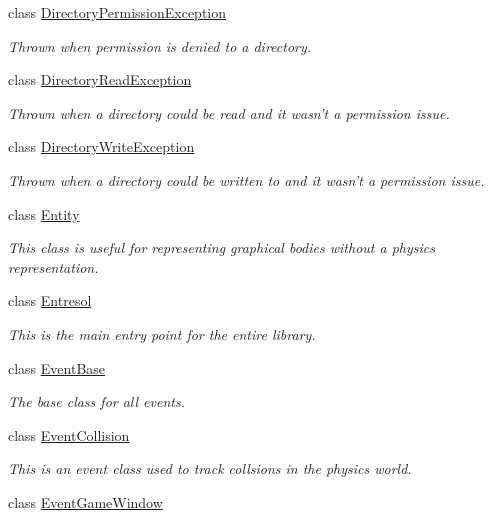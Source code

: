 \begin{DoxyCompactItemize}
class \hyperlink{classMezzanine_1_1DirectoryPermissionException}{Directory\-Permission\-Exception}
\begin{DoxyCompactList}\small\item\em Thrown when permission is denied to a directory. \end{DoxyCompactList}\item 
class \hyperlink{classMezzanine_1_1DirectoryReadException}{Directory\-Read\-Exception}
\begin{DoxyCompactList}\small\item\em Thrown when a directory could be read and it wasn't a permission issue. \end{DoxyCompactList}\item 
class \hyperlink{classMezzanine_1_1DirectoryWriteException}{Directory\-Write\-Exception}
\begin{DoxyCompactList}\small\item\em Thrown when a directory could be written to and it wasn't a permission issue. \end{DoxyCompactList}\item 
class \hyperlink{classMezzanine_1_1Entity}{Entity}
\begin{DoxyCompactList}\small\item\em This class is useful for representing graphical bodies without a physics representation. \end{DoxyCompactList}\item 
class \hyperlink{classMezzanine_1_1Entresol}{Entresol}
\begin{DoxyCompactList}\small\item\em This is the main entry point for the entire library. \end{DoxyCompactList}\item 
class \hyperlink{classMezzanine_1_1EventBase}{Event\-Base}
\begin{DoxyCompactList}\small\item\em The base class for all events. \end{DoxyCompactList}\item 
class \hyperlink{classMezzanine_1_1EventCollision}{Event\-Collision}
\begin{DoxyCompactList}\small\item\em This is an event class used to track collsions in the physics world. \end{DoxyCompactList}\item 
class \hyperlink{classMezzanine_1_1EventGameWindow}{Event\-Game\-Window}

\end{DoxyCompactItemize}
